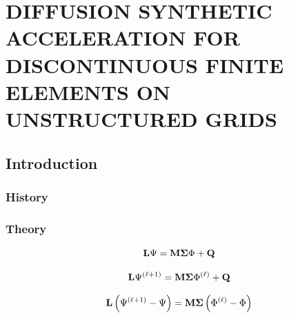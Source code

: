 %
%
%
\chapter{\uppercase {Diffusion Synthetic Acceleration for Discontinuous Finite Elements on Unstructured Grids}}
\label{sec::DSA}

\section{Introduction}
\label{sec::DSA_Introduction}

\subsection{History}
\label{sec::DSA_Introduction_History}

\subsection{Theory}
\label{sec::DSA_Introduction_Theory}



\begin{equation}
\label{eq::simple_trans_eq_op}
{\bf L} \Psi = {\bf M \Sigma} \Phi + {\bf Q}
\end{equation}

\begin{equation}
\label{eq::simple_trans_af_iterate}
{\bf L} \Psi^{(\ell+1)} = {\bf M \Sigma} \Phi^{(\ell)} + {\bf Q}
\end{equation}

\begin{equation}
\label{eq::simple_trans_iterate_err}
{\bf L} \left( \Psi^{(\ell+1)} - \Psi \right)= {\bf M \Sigma} \left( \Phi^{(\ell)} - \Phi \right)
\end{equation}

